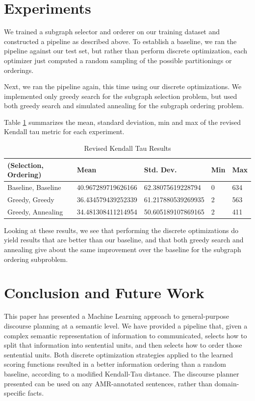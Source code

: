 \documentclass[12pt]{article}
\begin{document}
\section{Experiments}

We trained a subgraph selector and orderer on our training dataset and
constructed a pipeline as described above. To establish a baseline, we ran the
pipeline against our test set, but rather than perform discrete optimization,
each optimizer just computed a random sampling of the possible partitionings or
orderings.

Next, we ran the pipeline again, this time using our discrete optimizations.
We implemented only greedy search for the subgraph selection problem, but used
both greedy search and simulated annealing for the subgraph ordering problem.

Table \ref{tab:experiments} summarizes the mean, standard deviation, min and max of the
revised Kendall tau metric for each experiment.

\begin{table}[H]
\centering
\caption{Revised Kendall Tau Results}
\label{tab:experiments}
\begin{tabular}{@{}lllll@{}}
\toprule
\textbf{(Selection, Ordering)} & \textbf{Mean} & \textbf{Std. Dev.} & \textbf{Min} & \textbf{Max} \\ \midrule
Baseline, Baseline & 40.967289719626166 & 62.38075619228794 & 0 & 634 \\
Greedy, Greedy & 36.434579439252339 & 61.217880539269935 & 2 & 563 \\
Greedy, Annealing & 34.481308411214954 & 50.605189107869165 & 2 & 411 \\ \bottomrule
\end{tabular}
\end{table}

Looking at these results, we see that performing the discrete optimizations do
yield results that are better than our baseline, and that both greedy search
and annealing give about the same improvement over the baseline for the
subgraph ordering subproblem.

\section{Conclusion and Future Work}
This paper has presented a Machine Learning approach to general-purpose discourse planning at a semantic level. We have provided a pipeline that, given a complex semantic representation of information to communicated, selects how to split that information into sentential units, and then selects how to order those sentential units. Both discrete optimization strategies applied to the learned scoring functions resulted in a better information ordering than a random baseline, according to a modified Kendall-Tau distance. The discourse planner presented can be used on any AMR-annotated sentences, rather than domain-specific facts. 
\end{document}

